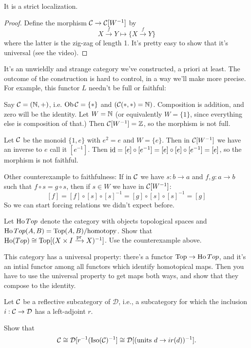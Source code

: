 \documentclass[class=report, crop=false,a4paper,twoside]{standalone}
\begin{document}
\begin{proposition}
	It is a strict localization.
\end{proposition}

\begin{proof}
	Define the morphism $\mathcal{C} \to \mathcal{C}[W^{-1}]$ by
	\[
	X \xrightarrow{f} Y \mapsto \{X \xrightarrow{f} Y\}
	\]
	where the latter is the zig-zag of length 1. It's pretty easy to show that it's universal (see the video). 
\end{proof}

It's an unwieldly and strange category we've constructed, a priori at least. The outcome of the construction is hard to control, in a way we'll make more precise. For example, this functor $L$ needn't be full or faithful:

Say $\mathcal{C} = (\mathbb{N},+)$, i.e. $\operatorname{Ob}\mathcal{C} = \{*\}$ and $(\mathcal{C}(*,*) = \mathbb{N})$. Composition is addition, and zero will be the identity. Let $W = \mathbb{N}$ (or equivalently $W = \{1\}$, since everything else is composition of that.) Then $\mathcal{C}[W^{-1}] = \mathbb{Z}$, so the morphism is not full.

Let $\mathcal{C}$ be the monoid $\{1,e\}$ with $e^2 = e$ and $W = \{e\}$. Then in $\mathcal{C}[W^{-1}]$ we have an inverse to $e$ call it $[e^{-1}]$. Then $\operatorname{id} = [e] \circ [e^{-1}] = [e] \circ [e] \circ [e^{-1}] = [e]$, so the morphism is not faithful.

Other counterexample to faithfulness: If in $\mathcal{C}$ we have $s: b \to a$ and $f,g: a \to b$ such that $f \circ s= g \circ s$, then if $s \in W$ we have in $\mathcal{C}[W^{-1}]$:
\[
[f] = [f] \circ [s] \circ [s]^{-1} = [g] \circ [s] \circ [s]^{-1} = [g]
\]
So we can start forcing relations we didn't expect before.

\begin{exercise}
	Let $\operatorname{Ho}Top$ denote the category with objects topological spaces and $\operatorname{Ho}Top(A,B) = \operatorname{Top}(A,B)/\text{homotopy}$. Show that $\operatorname{Ho}(Top) \cong \operatorname{Top}[(X \times I \xrightarrow{\operatorname{pr}} X)^{-1}]$. Use the counterexample above.

	This category has a universal property: there's a functor $\operatorname{Top} \to \operatorname{Ho}Top$, and it's an intial functor among all functors which identify homotopical maps. Then you have to use the universal property to get maps both ways, and show that they compose to the identity.
\end{exercise}

\begin{exercise}
	Let $\mathcal{C}$ be a reflective subcategory of $\mathcal{D}$, i.e., a subcategory for which the inclusion $i: \mathcal{C} \to \mathcal{D}$ has a left-adjoint $r$.

	Show that 
	\[
	\mathcal{C} \cong \mathcal{D}[r^{-1}(\operatorname{Iso}(\mathcal{C})^{-1}] \cong \mathcal{D}[(\text{units }d \to ir(d))^{-1}]. 
	\]
\end{exercise}
\end{document}
